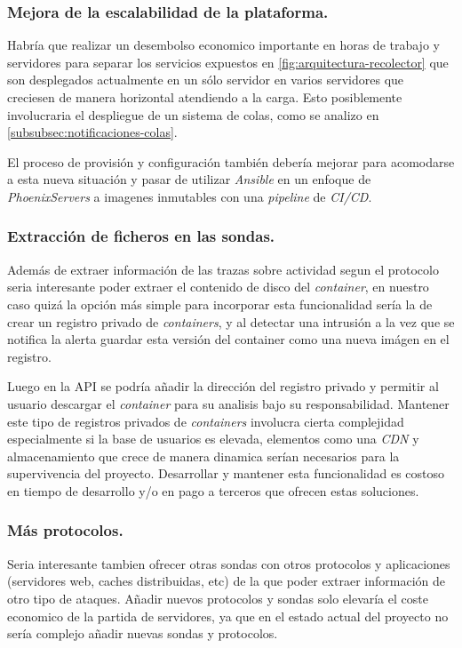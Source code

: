 \subsubsection{Mejora de la escalabilidad de la plataforma.}

Habría que realizar un desembolso economico importante en horas de trabajo y servidores para separar los servicios expuestos
en \ref{fig:arquitectura-recolector} que son desplegados actualmente en un sólo servidor en varios servidores que creciesen
de manera horizontal atendiendo a la carga. Esto posiblemente involucraria el despliegue de un sistema de colas, como se analizo
en \ref{subsubsec:notificaciones-colas}.

El proceso de provisión y configuración también debería mejorar para acomodarse a esta nueva situación y pasar de utilizar \emph{Ansible}
en un enfoque de \emph{PhoenixServers} a imagenes inmutables con una \emph{pipeline} de \emph{CI/CD}.

\subsubsection{Extracción de ficheros en las sondas.}

Además de extraer información de las trazas sobre actividad segun el protocolo seria interesante poder extraer el contenido de disco del \emph{container},
en nuestro caso quizá la opción más simple para incorporar esta funcionalidad sería la de crear un registro privado de \emph{containers}, y al detectar 
una intrusión a la vez que se notifica la alerta guardar esta versión del container como una nueva imágen en el registro.

Luego en la API se podría añadir la dirección del registro privado y permitir al usuario descargar el \emph{container} para su analisis bajo su responsabilidad. 
    Mantener este tipo de registros privados de \emph{containers} involucra cierta complejidad especialmente si la base de usuarios es elevada, elementos como
una \emph{CDN} y almacenamiento que crece de manera dinamica serían necesarios para la supervivencia del proyecto. Desarrollar y mantener esta funcionalidad
es costoso en tiempo de desarrollo y/o en pago a terceros que ofrecen estas soluciones.

\subsubsection{Más protocolos.}

Seria interesante tambien ofrecer otras sondas con otros protocolos y aplicaciones (servidores web, caches distribuidas, etc) de la que poder extraer información de otro
tipo de ataques. Añadir nuevos protocolos y sondas solo elevaría el coste economico de la partida de servidores, ya que en el estado actual del proyecto no sería 
complejo añadir nuevas sondas y protocolos.

